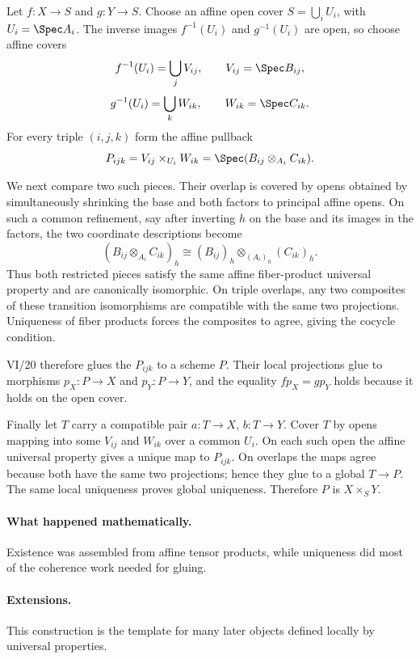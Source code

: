 \begin{solution}
Let $f:X\to S$ and $g:Y\to S$.  Choose an affine open cover
$S=\bigcup_iU_i$, with $U_i=\Spec A_i$.  The inverse images $f^{-1}(U_i)$ and $g^{-1}(U_i)$ are
open, so choose affine covers
\[
f^{-1}(U_i)=\bigcup_jV_{ij},\qquad V_{ij}=\Spec B_{ij},
\]
\[
g^{-1}(U_i)=\bigcup_kW_{ik},\qquad W_{ik}=\Spec C_{ik}.
\]
For every triple $(i,j,k)$ form the affine pullback
\[
P_{ijk}=V_{ij}\times_{U_i}W_{ik}
=\Spec(B_{ij}\otimes_{A_i}C_{ik}).
\]

We next compare two such pieces.  Their overlap is covered by opens obtained by simultaneously
shrinking the base and both factors to principal affine opens.  On such a common refinement,
say after inverting $h$ on the base and its images in the factors, the two coordinate
descriptions become
\[
(B_{ij}\otimes_{A_i}C_{ik})_h
\cong
(B_{ij})_h\otimes_{(A_i)_h}(C_{ik})_h.
\]
Thus both restricted pieces satisfy the same affine fiber-product universal property and are
canonically isomorphic.  On triple overlaps, any two composites of these transition isomorphisms
are compatible with the same two projections.  Uniqueness of fiber products forces the composites
to agree, giving the cocycle condition.

VI/20 therefore glues the $P_{ijk}$ to a scheme $P$.  Their local projections glue to morphisms
$p_X:P\to X$ and $p_Y:P\to Y$, and the equality $fp_X=gp_Y$ holds because it holds on the open
cover.

Finally let $T$ carry a compatible pair $a:T\to X$, $b:T\to Y$.  Cover $T$ by opens mapping into
some $V_{ij}$ and $W_{ik}$ over a common $U_i$.  On each such open the affine universal property
gives a unique map to $P_{ijk}$.  On overlaps the maps agree because both have the same two
projections; hence they glue to a global $T\to P$.  The same local uniqueness proves global
uniqueness.  Therefore $P$ is $X\times_SY$.
\end{solution}

\paragraph{What happened mathematically.}
Existence was assembled from affine tensor products, while uniqueness did most of the coherence work needed for gluing.

\paragraph{Extensions.}
This construction is the template for many later objects defined locally by universal properties.
\fi
